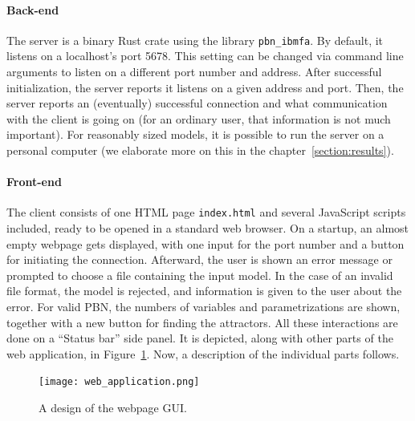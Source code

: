 \documentclass[
	digital, oneside, nosansbold, nocolorbold, nolot, nolof
]{fithesis4}
\theoremstyle{definition}
\theoremstyle{definition}
\begin{document}
\paragraph{Back-end}

The server is a binary Rust crate using the library \texttt{pbn\_ibmfa}. By
default, it listens on a localhost's port 5678. This setting can be changed via
command line arguments to listen on a different port number and address. After
successful initialization, the server reports it listens on a given address and
port. Then, the server reports an (eventually) successful connection and what
communication with the client is going on (for an ordinary user, that
information is not much important). For reasonably sized models, it is possible
to run the server on a personal computer (we elaborate more on this in the
chapter~\ref{section:results}).

\paragraph{Front-end}

The client consists of one HTML page \verb|index.html| and several JavaScript
scripts included, ready to be opened in a standard web browser. On a startup,
an almost empty webpage gets displayed, with one input for the port number and
a button for initiating the connection. Afterward, the user is shown an error
message or prompted to choose a file containing the input model. In the case of
an invalid file format, the model is rejected, and information is given to the
user about the error. For valid PBN, the numbers of variables and
parametrizations are shown, together with a new button for finding the
attractors. All these interactions are done on a \enquote{Status bar} side
panel. It is depicted, along with other parts of the web application, in
Figure~\ref{fig:web_app}. Now, a description of the individual parts follows.

\begin{figure}[!ht]
\centering
\texttt{[image: web\_application.png]}
\caption{A design of the webpage GUI.}
\label{fig:web_app}
\end{figure}
\end{document}
